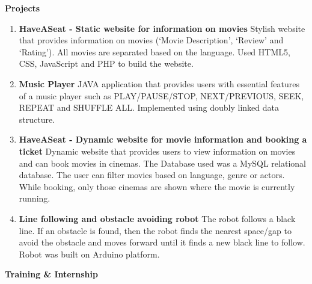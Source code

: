 \documentclass[a4paper,12pt,final]{memoir}
\newcommand{\Sep}{\vspace{1.5em}}
\newcommand{\SmallSep}{\vspace{0.5em}}
\newcommand{\CVSection}[1]
{\Large\textbf{#1}\par
	\SmallSep\normalsize\normalfont}
\begin{document}
	\CVSection{Projects}
		\begin{enumerate}
			\item \textbf{HaveASeat - Static website for information on movies} \newline
			{\footnotesize Stylish website that provides information on movies (‘Movie Description’, ‘Review’ and ‘Rating’). All movies are separated based on the language. Used HTML5, CSS, JavaScript and PHP to build the website.}
			\item \textbf{Music Player} \newline
			{\footnotesize JAVA application that provides users with essential features of a music player such as PLAY/PAUSE/STOP, NEXT/PREVIOUS, SEEK, REPEAT and SHUFFLE ALL. Implemented using doubly linked data structure.}
			\item \textbf{HaveASeat - Dynamic website for movie information and booking a ticket} \newline
			{\footnotesize Dynamic website that provides users to view information on movies and can book movies in cinemas. The Database used was a MySQL relational database. The user can filter movies based on language, genre or actors. While booking, only those cinemas are shown where the movie is currently running.}
			\item \textbf{Line following and obstacle avoiding robot} \newline
			{\footnotesize The robot follows a black line. If an obstacle is found, then the robot finds the nearest space/gap to avoid the obstacle and moves forward until it finds a new black line to follow. Robot was built on Arduino platform.}
		\end{enumerate}
	\Sep
	\clearpage
	\framebreak
	\framebreak
	\CVSection{Training \& Internship}
\end{document}
